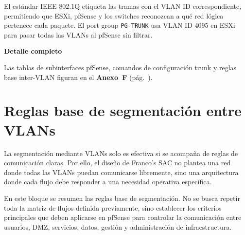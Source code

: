 \documentclass[11pt, a4paper, oneside]{report}
\newenvironment{notabox}[1]{%
  \begin{lrbox}{\notaboxsb}%
  \begin{minipage}{\dimexpr\textwidth-2\fboxsep\relax}%
  \vspace{4pt}\textcolor{upeu_dark}{\textbf{#1}}\\[2pt]\small%
}{%
  \vspace{4pt}%
  \end{minipage}%
  \end{lrbox}%
  \vspace{6pt}\par\noindent\colorbox{upeu_light}{\usebox{\notaboxsb}}\par\vspace{6pt}%
}
\begin{document}
El estándar IEEE 802.1Q etiqueta las tramas con el VLAN ID correspondiente, permitiendo que ESXi, pfSense y los switches reconozcan a qué red lógica pertenece cada paquete. El port group \texttt{PG-TRUNK} usa VLAN ID 4095 en ESXi para pasar todas las VLANs al pfSense sin filtrar.

\begin{notabox}{Detalle completo}
Las tablas de subinterfaces pfSense, comandos de configuración trunk y reglas base inter-VLAN figuran en el \textbf{Anexo~F} (pág.~\pageref{anex:routing}).
\end{notabox}
\section{Reglas base de segmentación entre VLANs}

La segmentación mediante VLANs solo es efectiva si se acompaña de reglas de comunicación claras. Por ello, el diseño de Franco's SAC no plantea una red donde todas las VLANs puedan comunicarse libremente, sino una arquitectura donde cada flujo debe responder a una necesidad operativa específica.

En este bloque se resumen las reglas base de segmentación. No se busca repetir toda la matriz de flujos definida previamente, sino establecer los criterios principales que deben aplicarse en pfSense para controlar la comunicación entre usuarios, DMZ, servicios, datos, gestión y administración de infraestructura.

\renewcommand{\arraystretch}{1.3}
\footnotesize
{}
\end{document}
